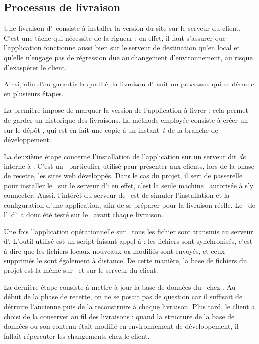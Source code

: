 \subsection{Processus de livraison}
\label{section:eyrolles_prod}

Une livraison d'\aey\ consiste à installer la version du site sur le serveur du client. C'est une tâche qui nécessite de la rigueur : en effet, il faut s'assurer que l'application fonctionne aussi bien sur le serveur de destination qu'en local et qu'elle n'engage pas de régression due au changement d'environnement, au risque d'exaspérer le client.

Ainsi, afin d'en garantir la qualité, la livraison d'\aey\ suit un processus qui se déroule en plusieurs étapes.

La première impose de marquer la version de l'application à livrer : cela permet de garder un historique des livraisons. La méthode employée consiste à créer un \emph{\atag} sur le dépôt \asvn, qui est en fait une copie à un instant~$t$ de la branche de développement.

La deuxième étape concerne l'installation de l'application sur un serveur dit \emph{de \astaging} interne à \asl. C'est un \avserver\ particulier utilisé pour présenter aux clients, lors de la phase de recette, les sites web développés. Dans le cas du projet, il sert de passerelle pour installer le \alotdeux\ sur le serveur d'\aey : en effet, c'est la seule \og machine \fg\ autorisée à s'y connecter. Aussi, l'intérêt du serveur de \astaging\ est de simuler l'installation et la configuration d'une application, afin de se préparer pour la livraison réelle. Le \alotdeux\ de l'\aintranet\ d'\aey\ a donc été testé sur le \astaging\ avant chaque livraison.

Une fois l'application opérationnelle sur \astaging, tous les fichier sont transmis au serveur d'\aey. L'outil utilisé est un script faisant appel à \arsync : les fichiers sont synchronisés, c'est-à-dire que les fichiers locaux nouveaux ou modifiés sont envoyés, et ceux supprimés le sont également à distance. De cette manière, la base de fichiers du projet est la même sur \astaging\ et sur le serveur du client.

La dernière étape consiste à mettre à jour la base de données du \alotdeux\ chez \aey. Au début de la phase de recette, on ne se posait pas de question car il suffisait de détruire l'ancienne puis de la reconstruire à chaque livraison. Plus tard, le client a choisi de la conserver au fil des livraisons : quand la structure de la base de données ou son contenu était modifié en environnement de développement, il fallait répercuter les changements chez le client.
